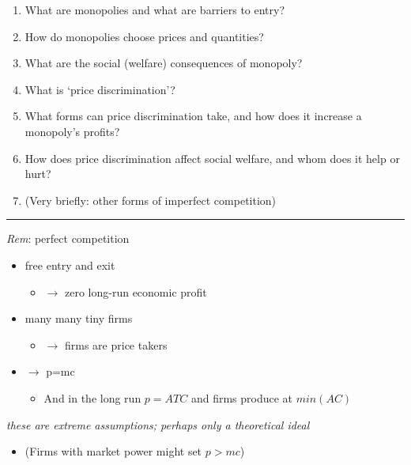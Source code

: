\documentclass[]{article}
\providecommand{\tightlist}{%
  \setlength{\itemsep}{0pt}\setlength{\parskip}{0pt}}
\begin{document}
\begin{enumerate}
\def\labelenumi{\arabic{enumi}.}
\item
  What are monopolies and what are barriers to entry?
\item
  How do monopolies choose prices and quantities?
\item
  What are the social (welfare) consequences of monopoly?
\item
  What is `price discrimination'?
\item
  What forms can price discrimination take, and how does it increase a
  monopoly's profits?
\item
  How does price discrimination affect social welfare, and whom does it
  help or hurt?
\item
  (Very briefly: other forms of imperfect competition)
\end{enumerate}

\begin{center}\rule{0.5\linewidth}{\linethickness}\end{center}

\emph{Rem}: perfect competition

\begin{itemize}
\tightlist
\item
  free entry and exit

  \begin{itemize}
  \tightlist
  \item
    \(\rightarrow\) zero long-run economic profit
  \end{itemize}
\item
  many many tiny firms

  \begin{itemize}
  \tightlist
  \item
    \(\rightarrow\) firms are price takers
  \end{itemize}
\item
  \(\rightarrow\) p=mc

  \begin{itemize}
  \tightlist
  \item
    And in the long run \(p=ATC\) and firms produce at \(min(AC)\)
  \end{itemize}
\end{itemize}

\bigskip

\emph{these are extreme assumptions; perhaps only a theoretical ideal}

\bigskip

\begin{itemize}
\tightlist
\item
  (Firms with market power might set \(p>mc\))
\end{itemize}
\end{document}
